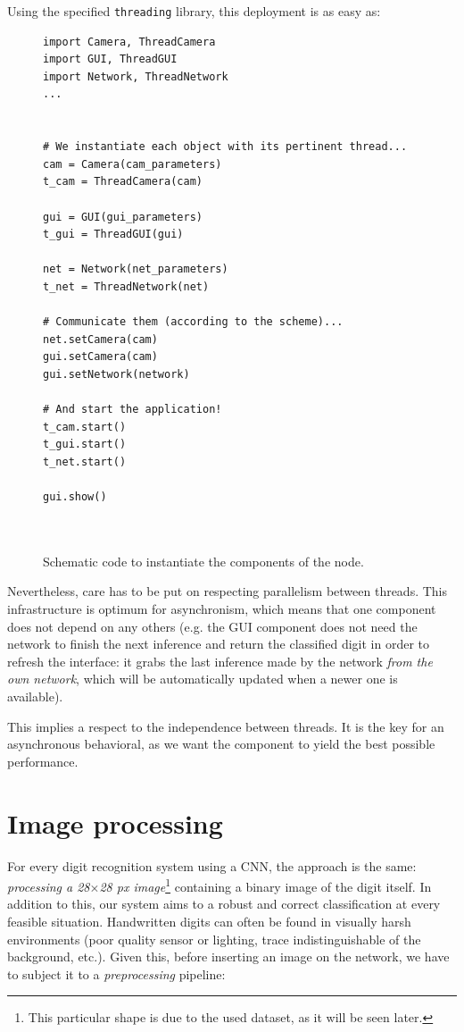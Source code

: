 		Using the specified \texttt{threading} library, this deployment is as easy as:
		\begin{figure}[h!]
			\centering

			\begin{lstlisting}
import Camera, ThreadCamera
import GUI, ThreadGUI
import Network, ThreadNetwork
...


# We instantiate each object with its pertinent thread...
cam = Camera(cam_parameters)
t_cam = ThreadCamera(cam)

gui = GUI(gui_parameters)
t_gui = ThreadGUI(gui)

net = Network(net_parameters)
t_net = ThreadNetwork(net)

# Communicate them (according to the scheme)...
net.setCamera(cam)
gui.setCamera(cam)
gui.setNetwork(network)

# And start the application!
t_cam.start()
t_gui.start()
t_net.start()

gui.show()

	
			\end{lstlisting}
			
			\caption{Schematic code to instantiate the components of the node.}
			\label{fig:4_digitclassifier_code}
		\end{figure}
		Nevertheless, care has to be put on respecting parallelism between threads. This infrastructure is optimum for asynchronism, which means that one component does not depend on any others (e.g. the GUI component does not need the network to finish the next inference and return the classified digit in order to refresh the interface: it grabs the last inference made by the network \emph{from the own network}, which will be automatically updated when a newer one is available).
		
		This implies a respect to the independence between threads. It is the key for an asynchronous behavioral, as we want the component to yield the best possible performance.\\
		
	\section{Image processing}
		For every digit recognition system using a CNN, the approach is the same: \emph{processing a 28$\times$28 px image}\footnote{This particular shape is due to the used dataset, as it will be seen later.} containing a binary image of the digit itself. In addition to this, our system aims to a robust and correct classification at every feasible situation. Handwritten digits can often be found in visually harsh environments (poor quality sensor or lighting, trace indistinguishable of the background, etc.). Given this, before inserting an image on the network, we have to subject it to a \emph{preprocessing} pipeline:
		
